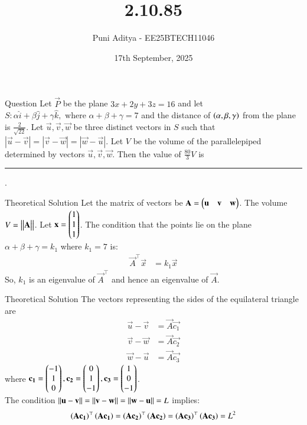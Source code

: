 \documentclass{beamer}
\title{2.10.85}
\date{17th September, 2025}
\author{Puni Aditya - EE25BTECH11046}
\begin{document}
\frame{\titlepage}
\begin{frame}{Question}
Let $\vec{P}$ be the plane $3x + 2y + 3z = 16$ and let 
$S : \alpha \hat{i} + \beta \hat{j} + \gamma \hat{k},\text{ where } \alpha + \beta + \gamma = 7$
and the distance of $\left(\alpha, \beta, \gamma\right)$ from the plane is $\frac{2}{\sqrt{22}}$.
Let $\vec{u}, \vec{v}, \vec{w}$ be three distinct vectors in $S$ such that $|\vec{u} - \vec{v}| = |\vec{v} - \vec{w}| = |\vec{w} - \vec{u}|$. Let $V$ be the volume of the parallelepiped determined by vectors $\vec{u}, \vec{v}, \vec{w}$. Then the value of $\frac{80}{3} V$ is
\rule{1cm}{0.1pt}.
\end{frame}

\begin{frame}{Theoretical Solution}
Let the matrix of vectors be $\mathbf{A} = \begin{pmatrix}\mathbf{u} & \mathbf{v} & \mathbf{w}\end{pmatrix}$. The volume $V = \left\vert\begin{vmatrix}\mathbf{A}\end{vmatrix}\right\vert$.
Let $\mathbf{x} = \begin{pmatrix}1 \\ 1 \\ 1\end{pmatrix}$. The condition that the points lie on the plane $\alpha+\beta+\gamma=k_1$ where $k_1=7$ is:
\begin{align}
    \vec{A}^\top\vec{x} &= k_1\vec{x} \label{eq:eigen}
\end{align}
So, $k_1$ is an eigenvalue of $\vec{A}^\top$ and hence an eigenvalue of $\vec{A}$. \\
\end{frame}

\begin{frame}{Theoretical Solution}
The vectors representing the sides of the equilateral triangle are
\begin{align}
    \vec{u} - \vec{v} &= \vec{A}\vec{c_1} \label{eq:1} \\
    \vec{v} - \vec{w} &= \vec{A}\vec{c_2} \label{eq:2} \\
    \vec{w} - \vec{u} &= \vec{A}\vec{c_3} \label{eq:3}
\end{align}
where $\mathbf{c_1} = \begin{pmatrix}-1 \\ 1 \\ 0\end{pmatrix}, \mathbf{c_2} = \begin{pmatrix}0 \\ 1 \\ -1\end{pmatrix}, \mathbf{c_3} = \begin{pmatrix}1 \\ 0 \\ -1\end{pmatrix}$. \\
The condition $\left\lVert\mathbf{u} - \mathbf{v}\right\rVert = \left\lVert\mathbf{v} - \mathbf{w}\right\rVert = \left\lVert\mathbf{w} - \mathbf{u}\right\rVert = L$ implies:
\begin{align}
    \left(\mathbf{A}\mathbf{c_1}\right)^\top\left(\mathbf{A}\mathbf{c_1}\right) = \left(\mathbf{A}\mathbf{c_2}\right)^\top\left(\mathbf{A}\mathbf{c_2}\right) = \left(\mathbf{A}\mathbf{c_3}\right)^\top\left(\mathbf{A}\mathbf{c_3}\right) = L^2 \label{eq:gram}
\end{align}
\end{frame}
\end{document}
